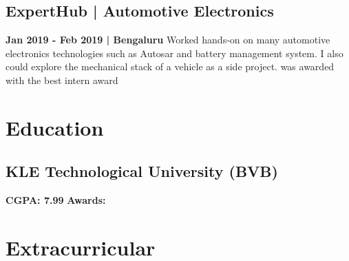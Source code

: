 \documentclass[]{Abhijoshi}
\begin{document}
\begin{minipage}[t]{0.47\textwidth}
\vspace{3mm}
\subsection{ExpertHub | A\MakeLowercase{utomotive} E\MakeLowercase{lectronics}}
\vspace{0.5mm}
\large \textbf{Jan 2019 - Feb 2019 | Bengaluru} 
\vspace{0.5mm}
\newline
Worked hands-on on many automotive electronics technologies such as Autosar and battery management system. I also could explore the mechanical stack of a vehicle as a side project.  was awarded with the best intern award 
\sectionsep

\section{Education} 
\vspace{2mm}
\subsection{KLE Technological University (BVB)}
\vspace{0.5mm}
\vspace{0.3mm}
\vspace{0.5mm}
\textbf{CGPA: 7.99}
\vspace{0.3mm}
\newline
\textbf{Awards:} 




\vspace{2mm}
\section{Extracurricular}
\\
\\
\\
\sectionsep

%
%

\end{minipage} 
\end{document}
